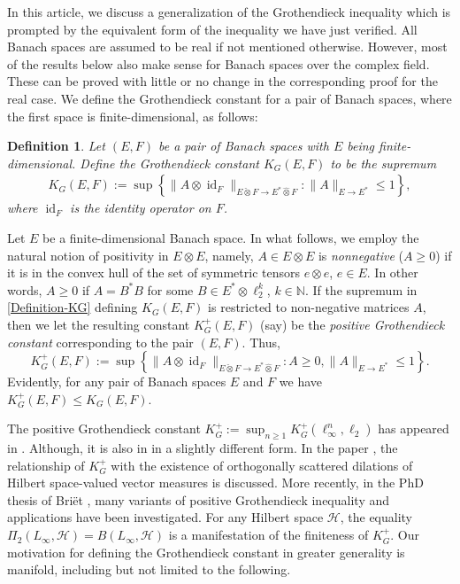 \documentclass[a4paper,oneside,11pt, reqno]{amsart}
\numberwithin{equation}{section}
\newtheorem{definition}[theorem]{Definition}
\theoremstyle{plain}
\begin{document}
In this article, we discuss a generalization of the Grothendieck inequality which is prompted by the equivalent form of the inequality we have just verified. All Banach spaces are assumed to be real if not mentioned otherwise. However, most of the results below also make sense for Banach spaces over the complex field. 
These can be proved with little or no change in the corresponding proof for the real case. 
We define the Grothendieck constant for a pair of Banach spaces, where the first space is finite-dimensional, as follows: 
\begin{definition} %
Let $(E,F)$ be a pair of Banach spaces with $E$ being finite-dimensional. Define the Grothendieck constant $K_G(E,F)$ to be the supremum  
\begin{eqnarray}\label{Definition-KG}
K_G(E,F):=\sup\left\{\|A\otimes \operatorname{id}_F\|_{E\check{\otimes}F\to E^*\hat{\otimes}F}:\|A\|_{E\to E^*}\leqslant 1\right\},
\end{eqnarray}
where $\operatorname{id}_F$ is the identity operator on $F$.
\end{definition} 
  Let $E$ be a finite-dimensional Banach space. In what follows, we employ the natural notion of positivity in $E\otimes E$, namely, $A\in E\otimes E$ is \textit{nonnegative} ($A\geqslant 0$) if it is in the convex hull of the set of symmetric tensors $e\otimes e$, $e \in E$. In other words, $A\geqslant 0$ if $A = B^*B$  for some $B \in E^*\otimes \ell_2^k$, $k\in\mathbb N$. If the supremum in \eqref{Definition-KG} defining $K_G(E,F)$ is restricted to non-negative matrices $A$, then we let the resulting constant $K_G^+(E, F)$ (say) be the {\it positive Grothendieck constant} corresponding to the pair $(E,F)$. Thus, 
\begin{equation}\label{Definition-KG+}
K_G^+(E,F) := \sup\left\{\|A\otimes \operatorname{id}_F\|_{E\check{\otimes}F\to E^*\hat{\otimes}F}:A \geqslant 0, \|A\|_{E\to E^*}\leqslant 1\right\}.\end{equation}
Evidently, for any pair of Banach spaces $E$ and $F$ we 
have $K_G^+(E,F)\leqslant K_G(E,F)$.


The positive Grothendieck constant $K_G^+:=\sup_{n\geqslant 1}K_G^{+}(\ell_\infty^n,\ell_2)$ has appeared in \cite[Theorem 4]{Rietz}. Although, it is also in \cite{Grothendieck} in a slightly different form. In the paper \cite{H}, the relationship of $K_G^+$ with the existence of orthogonally scattered dilations of Hilbert space-valued vector measures is discussed. More recently, in the PhD thesis of Bri\"{e}t \cite{Briet}, many variants of positive Grothendieck inequality and applications have been investigated. For any Hilbert space $\mathcal{H}$, the equality $\Pi_2(L_\infty,\mathcal H)= B(L_\infty,\mathcal H)$ is a manifestation of the finiteness of  $K_G^{+}$. Our motivation for defining the Grothendieck constant in greater generality is manifold, including but not limited to the following.
\end{document}
